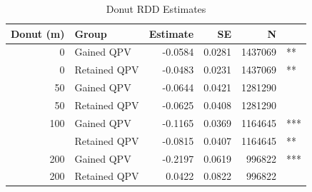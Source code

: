 \begin{table}

\caption{\label{tab:donut}Donut RDD Estimates}
\centering
\begin{tabular}[t]{rlrrrl}
\toprule
Donut (m) & Group & Estimate & SE & N & \\
\midrule
0 & Gained QPV & -0.0584 & 0.0281 & 1437069 & **\\
0 & Retained QPV & -0.0483 & 0.0231 & 1437069 & **\\
50 & Gained QPV & -0.0644 & 0.0421 & 1281290 & \\
50 & Retained QPV & -0.0625 & 0.0408 & 1281290 & \\
100 & Gained QPV & -0.1165 & 0.0369 & 1164645 & ***\\
\addlinespace
100 & Retained QPV & -0.0815 & 0.0407 & 1164645 & **\\
200 & Gained QPV & -0.2197 & 0.0619 & 996822 & ***\\
200 & Retained QPV & 0.0422 & 0.0822 & 996822 & \\
\bottomrule
\end{tabular}
\end{table}
